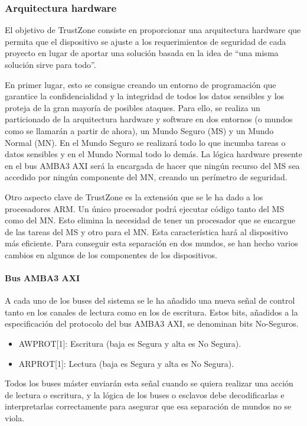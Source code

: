 \subsubsection{Arquitectura hardware}
El objetivo de TrustZone consiste en proporcionar una arquitectura hardware que permita que el dispositivo se ajuste a los requerimientos de seguridad de cada proyecto en lugar de aportar una solución basada en la idea de “una misma solución sirve para todo”. \newline

En primer lugar, esto se consigue creando un entorno de programación que garantice la confidencialidad y la integridad de todos los datos sensibles y los proteja de la gran mayoría de posibles ataques. Para ello, se realiza un particionado de la arquitectura hardware y software en dos entornos (o mundos como se llamarán a partir de ahora), un Mundo Seguro (MS) y un Mundo Normal (MN). En el Mundo Seguro se realizará todo lo que incumba tareas o datos sensibles y en el Mundo Normal todo lo demás. La lógica hardware presente en el bus AMBA3 AXI será la encargada de hacer que ningún recurso del MS sea accedido por ningún componente del MN, creando un perímetro de seguridad. \newline

Otro aspecto clave de TrustZone es la extensión que se le ha dado a los procesadores ARM. Un único procesador podrá ejecutar código tanto del MS como del MN. Esto elimina la necesidad de tener un procesador que se encargue de las tareas del MS y otro para el MN. Esta característica hará al dispositivo más eficiente. 
Para conseguir esta separación en dos mundos, se han hecho varios cambios en algunos de los componentes de los dispositivos.


\paragraph{Bus AMBA3 AXI}
A cada uno de los buses del sistema se le ha añadido una nueva señal de control tanto en los canales de lectura como en los de escritura. Estos bits, añadidos a la especificación del protocolo del bus AMBA3 AXI, se denominan bits No-Seguros.
\begin{itemize}
	\item AWPROT[1]: Escritura (baja es Segura y alta es No Segura).
	\item ARPROT[1]: Lectura (baja es Segura y alta es No Segura).
\end{itemize}

Todos los buses máster enviarán esta señal cuando se quiera realizar una acción de lectura o escritura, y la lógica de los buses o esclavos debe decodificarlas e interpretarlas correctamente para asegurar que esa separación de mundos no se viola.


